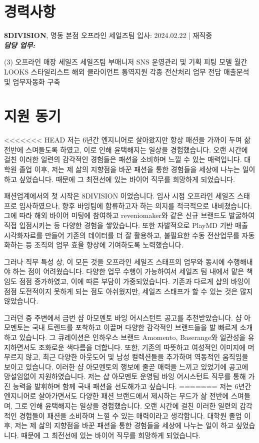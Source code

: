 \documentclass[a4paper,10pt]{extarticle}
\begin{document}
\section*{경력사항}
\noindent
{\large\textbf{8DIVISION}}, 명동 본점 오프라인 세일즈팀 \hfill 입사: 2024.02.22 | 재직중\\
{\textbf{\textit{담당 업무:}}}
\begin{tasks}[style=itemize](3)
	\task 오프라인 매장 세일즈
	\task 세일즈팀 부매니저
	\task SNS 운영관리 및 기획
	\task 피팅 모델
	\task 월간 LOOKS 스타일리스트
	\task 해외 클라이언트 통역지원
	\task 각종 전산처리 업무 전담
	\task 매출분석 및 업무자동화 구축
\end{tasks}

\section*{지원 동기}
<<<<<<< HEAD
저는 6년간 엔지니어로 살아왔지만 항상 패션을 가까이 두며 삶 전반에 스며들도록 하였고, 이로 인해 윤택해지는 일상을 경험했습니다. 오랜 시간에 걸친 이러한 일련의 감각적인 경험들은 패션을 소비하며 느낄 수 있는 매력입니다. 대학원 졸업 이후, 저는 제 삶의 지향점을 바꾼 패션을 통한 경험들을 세상에 나누는 일이 하고 싶었습니다. 때문에 그 최전선에 있는 바이어 직무를 희망하게 되었습니다.

패션업계에서의 첫 시작은 8DIVISION 이었습니다. 입사 시점 오프라인 세일즈 스태프로 입사하였으나, 향후 바잉팀에 합류하고자 하는 의지를 적극적으로 내비쳤습니다. 그에 따라 해외 바이어 미팅에 참여하고 reveniomaker와 같은 신규 브랜드도 발굴하여 직접 입점시키는 등 다양한 경험을 쌓았습니다. 또한 자발적으로 PlayMD 기반 매출 시각화자료를 만들어 기존의 데이터를 더 잘 활용하고, 불필요한 수동 전산업무를 자동화하는 등 조직의 업무 효율 향상에 기여하도록 노력했습니다.

그러나 직무 특성 상, 이 모든 것을 오프라인 세일즈 스태프의 업무와 동시에 수행해내야 하는 점이 어려웠습니다. 다양한 업무 수행이 가능하여서 세일즈 팀 내에서 맡은 책임도 점점 증가하였고, 이에 따른 부담이 가중되었습니다. 기존과 다르게 샵의 바잉이 점점 도전적이지 못하게 되는 점도 아쉬웠지만, 세일즈 스태프가 할 수 있는 것은 많지 않았습니다.

그러던 중 주변에서 금번 샵 아모멘토 바잉 어시스턴트 공고를 추천받았습니다. 샵 아모멘토는 국내 트렌드를 포착하고 이끌며 다양한 감각적인 브랜드들을 발 빠르게 소개하고 있습니다. 그 큐레이션은 인하우스 브랜드 Amomento, Baserange와 일관성을 유지하면서도 조화로운 색다름을 더합니다. 또한, 기존의 따뜻하고 여성적인 이미지에 머무르지 않고, 최근 다양한 아웃도어 및 남성 컬렉션들을 추가하며 역동적인 움직임을 보이고 있습니다. 이러한 샵 아모멘토의 행보에 줄곧 매력을 느끼고 있었기에 공고에 망설임없이 지원하였습니다. 저는 샵 아모멘토 운영팀 바잉 어시스턴트 직무를 통해 가진 능력을 발휘하며 함께 국내 패션을 선도해가고 싶습니다.
=======
저는 6년간 엔지니어로 살아가면서도 다양한 패션 브랜드에서 제시하는 무드가 삶 전반에 스며들며, 그로 인해 윤택해지는 일상을 경험했습니다. 오랜 시간에 걸친 이러한 일련의 감각적인 경험들이 패션을 소비하며 느낄 수 있는 매력이라고 생각합니다. 대학원 졸업 이후, 저는 제 삶의 지향점을 바꾼 패션을 통한 경험들을 세상에 나누는 일이 하고 싶었습니다. 때문에 그 최전선에 있는 바이어 직무를 희망하게 되었습니다.
\end{document}
